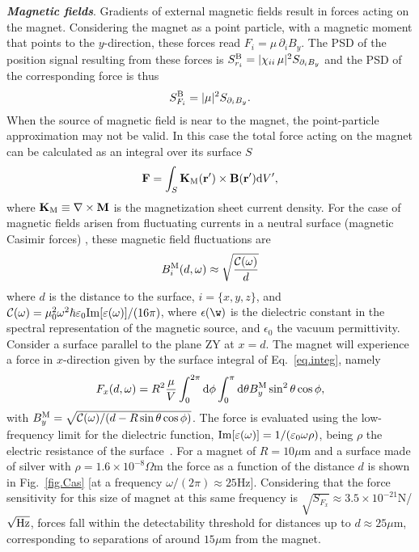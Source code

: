 \documentclass[twocolumn,superscriptaddress,floatfix,preprintnumbers,prl]{revtex4}
\begin{document}
\textbf{\textit{Magnetic fields}}. Gradients of external magnetic fields result in forces acting on the magnet. Considering the magnet as a point particle, with a magnetic moment that points to the $y$-direction, these forces read $F_i=\mu\, \partial_i B_y$. The PSD of the position signal resulting from these forces is $S_{r_i}^{\rm B}=|\chi_{ii}\, \mu|^2S_{\partial_iB_y}$ and the PSD of the corresponding force is thus
\begin{equation}
S_{F_i}^{\rm B}=|\mu|^2S_{\partial_iB_y}.
\end{equation}
When the source of magnetic field is near to the magnet, the point-particle approximation may not be valid. In this case the total force acting on the magnet can be calculated as an integral over its surface $S$
\begin{equation}
\mathbf{F}=\int_S \mathbf{K}_{\rm M}(\mathbf{r}')\times\mathbf{B}(\mathbf{r}') {\rm d}V',\label{eq.integ}
\end{equation}
where $\mathbf{K}_{\rm M}\equiv \nabla \times \mathbf{M}$ is the magnetization sheet current density. For the case of magnetic fields arisen from fluctuating currents in a neutral surface (magnetic Casimir forces) \cite{henkel1999}, these magnetic field fluctuations are 
\begin{equation}
B^{\rm M}_i (d,\omega)\approx\sqrt{\frac{\mathcal{C}(\omega)}{d}}
\end{equation}
where $d$ is the distance to the surface, $i=\{x,y,z\}$, and $\mathcal{C}(\omega)=\mu_0^2 \omega^2 \hbar \varepsilon_0 {\rm Im}[\varepsilon(\omega)]/(16 \pi)$, where $\epsilon(\w)$ is the dielectric constant in the spectral representation of the magnetic source, and $\epsilon_0$ the vacuum permittivity. Consider a surface parallel to the plane ZY at $x=d$. The magnet will experience a force in $x$-direction given by the surface integral of Eq.~\eqref{eq.integ}, namely
\begin{equation}
F_x(d,\omega)=R^2 \frac{\mu}{V}\int_0^{2\pi} {\rm d}\phi\int_0^{\pi} {\rm d}\theta  B_y^{\rm M} \sin^2 \theta \cos \phi, 
\end{equation}
with $B_y^{\rm M}=\sqrt{\mathcal{C}(\omega)/(d-R \sin\theta \cos\phi)}$. The force is evaluated using the low-frequency limit for the dielectric function, ${\rm Im}[\varepsilon(\omega)]=1/(\varepsilon_0 \omega \rho)$, being $\rho$ the electric resistance of the surface~\cite{henkel1999}. For a magnet of $R=10\mu$m and a surface made of silver with $\rho=1.6\times10^{-8}\Omega$m the force as a function of the distance $d$ is shown in Fig.~\ref{fig.Cas} [at a frequency $\omega/(2\pi)\approx 25$Hz]. Considering that the force sensitivity for this size of magnet at this same frequency is $\sqrt{S_{F_x}}\approx 3.5\times 10^{-21}$N/$\sqrt{\rm Hz}$, forces fall within the detectability threshold for distances up to $d\approx25\mu$m, corresponding to separations of around $15\mu$m from the magnet. 
\end{document}
